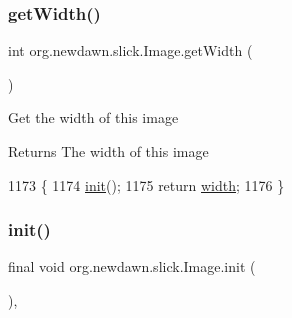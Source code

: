 \subsubsection{\texorpdfstring{get\+Width()}{getWidth()}}
{\footnotesize\ttfamily int org.\+newdawn.\+slick.\+Image.\+get\+Width (\begin{DoxyParamCaption}{ }\end{DoxyParamCaption})\hspace{0.3cm}{\ttfamily [inline]}}

Get the width of this image

\begin{DoxyReturn}{Returns}
The width of this image 
\end{DoxyReturn}

\begin{DoxyCode}
1173                           \{
1174         \mbox{\hyperlink{classorg_1_1newdawn_1_1slick_1_1_image_a94d180c9218ba1444a0496a1898ec345}{init}}();
1175         \textcolor{keywordflow}{return} \mbox{\hyperlink{classorg_1_1newdawn_1_1slick_1_1_image_a7d02c85e21b388428cfe5cc5c82714a1}{width}};
1176     \}
\end{DoxyCode}
\mbox{\label{classorg_1_1newdawn_1_1slick_1_1_image_a94d180c9218ba1444a0496a1898ec345}} 
\subsubsection{\texorpdfstring{init()}{init()}}
{\footnotesize\ttfamily final void org.\+newdawn.\+slick.\+Image.\+init (\begin{DoxyParamCaption}{ }\end{DoxyParamCaption})\hspace{0.3cm}{\ttfamily [inline]}, {\ttfamily [protected]}}

